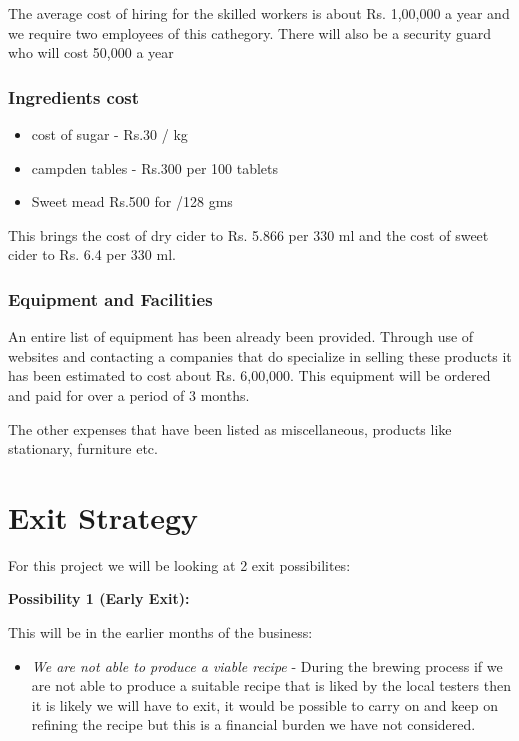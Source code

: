 \documentclass[11pt]{article}
\begin{document}
The average cost of hiring for the skilled workers is about Rs. 1,00,000 a year
and we require two employees of this cathegory. There will also be a security
guard who will cost 50,000 a year

   \subsubsection{Ingredients cost}
\begin{itemize}
\item cost of sugar -  Rs.30 / kg
\item campden tables  - Rs.300 per 100 tablets
\item Sweet mead Rs.500 for /128 gms
\end{itemize}

This brings the cost of dry cider to Rs. 5.866 per 330 ml and the cost of sweet 
cider to Rs. 6.4 per 330 ml.

     \subsubsection{Equipment and Facilities}
An entire list of equipment has been already been provided. Through use of
websites and contacting a companies that do specialize in selling these products
it has been estimated to cost about Rs. 6,00,000. This equipment will be 
ordered and paid for over a period of 3 months.

The other expenses that have been listed as miscellaneous, products like
stationary, furniture etc.

\newpage


\section{Exit Strategy}
For this project we will be looking at 2 exit possibilites:

\textbf{Possibility 1 (Early Exit):}

This will be in the earlier months of the business:
  \begin{itemize}
	\item \emph{We are not able to produce a viable recipe} - During the brewing
process if we are not able to produce a suitable recipe that is liked by the 
local testers then it is likely we will have to exit, it would be possible to 
carry on and keep on refining the recipe but this is a financial burden we have 
not considered.
  \end{itemize}
\end{document}
